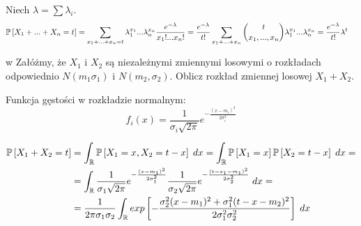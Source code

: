 \documentclass{article}
\begin{document}
Niech $\lambda=\sum\lambda_i$.
\begin{align*}
    \prob{X_1+...+X_n=t}&=\sum_{x_1+...+x_n=t}\lambda_1^{x_1}...\lambda_n^{x_n}\frac{e^{-\lambda}}{x_1!...x_n!}=\frac{e^{-\lambda}}{t!}\sum_{x_1+...+x_n}{t\choose x_1,...,x_n}\lambda_1^{x_1}...\lambda_n^{x_n}=\frac{e^{-\lambda}}{t!}\lambda^t
\end{align*}



\begin{problem}[12]{w}
Załóżmy, że $X_1$ i $X_2$ są niezależnymi zmiennymi losowymi o rozkładach odpowiednio $N(m_1\sigma_1)$ i $N(m_2,\sigma_2)$. Oblicz rozkład zmiennej losowej $X_1+X_2$.
\end{problem}

Funkcja gęstości w rozkładzie normalnym:
$$f_i(x)=\frac{1}{\sigma_i\sqrt{2\pi}}e^{-\frac{(x-m_i)^2}{2\sigma_i^2}}$$

\begin{align*}
    \prob{X_1+X_2= t}&=\int_\R\prob{X_1=x, X_2=t-x}\;dx=\int_\R\prob{X_1=x}\prob{X_2=t-x}\;dx=\\
    &=\int_\R\frac{1}{\sigma_1\sqrt{2\pi}}e^{-\frac{(x-m_1)^2}{2\sigma_1^2}}\frac{1}{\sigma_2\sqrt{2\pi}}e^{-\frac{(t-x_1-m_1)^2}{2\sigma_2^2}}\;dx=\\
    &=\frac{1}{2\pi\sigma_1\sigma_2}\int_\R exp\left[-\frac{\sigma_2^2(x-m_1)^2+\sigma_1^2(t-x-m_2)^2}{2\sigma_1^2\sigma_2^2}\right]\;dx
\end{align*}
\end{document}

